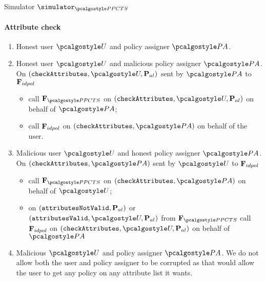 \documentclass[runningheads,10pt]{llncs}
\numberwithin{equation}{section}
\begin{document}
\begin{simbox}{Simulator $\simulator_{\PPCTS}$}
  \paragraph{Attribute check}
  \begin{enumerate}
  \item Honest user $\user$ and policy assigner $\polas$. 
    
  \item Honest user $\user$ and malicious policy assigner $\polas$. On
    $(\checkAttributes, \user, \alpolicy)$ sent by $\polas$ to $\mathbf{F}_{{idpol}}$
    \begin{itemize}
    \item call $\func{\PPCTS}$ on $(\checkAttributes, \user, \alpolicy)$ on behalf of
      $\polas$;
    \item call $\mathbf{F}_{{idpol}}$ on $(\checkAttributes, \polas)$ on behalf of the user.
    \end{itemize}
    
  \item Malicious user $\user$ and honest policy assigner $\polas$. On
    $(\checkAttributes, \polas)$ sent by $\user$ to $\mathbf{F}_{{idpol}}$
    \begin{itemize}
    \item call $\func{\PPCTS}$ on $(\checkAttributes, \polas)$ on behalf of
      $\user$;
    \item on $(\mathtt{attributesNotValid}, \mathbf{P}_{al})$ or
      $(\attributesValid, \user, \alpolicy)$ from $\func{\PPCTS}$ call
      $\mathbf{F}_{{idpol}}$ on $(\checkAttributes, \user, \alpolicy)$ on behalf of $\polas$
    \end{itemize}
    
  \item Malicious $\user$ and policy assigner $\polas$. We do not allow both the user and
    policy assigner to be corrupted as that would allow the user to get any policy on any
    attribute list it wants.
  \end{enumerate}
  

\end{simbox}
\end{document}
